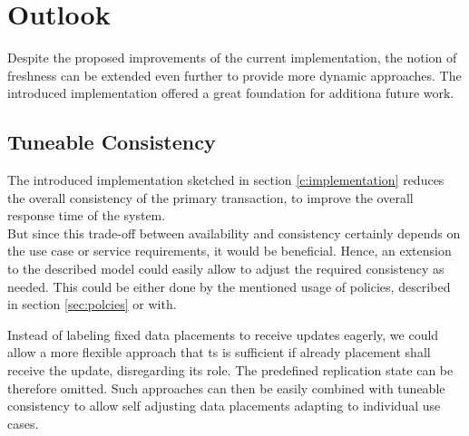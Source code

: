 \chapter{Outlook}
\label{c:outlook}


Despite the proposed improvements of the current implementation, the notion of freshness can be extended even further to provide more dynamic approaches.
The introduced implementation offered a great foundation for additiona future work.



\tocless\section{Tuneable Consistency}
The introduced implementation sketched in section \ref{c:implementation} reduces the overall consistency of the primary transaction,
to improve the overall response time of the system.\\ 
But since this trade-off between availability and consistency certainly depends on the use case or service requirements, it would be beneficial.
Hence, an extension to the described model could easily allow to adjust the required consistency as needed. 
This could be either done by the mentioned usage of policies, described in section \ref{sec:polcies} or with.

Instead of labeling fixed data placements to receive updates eagerly, we could allow a more flexible approach that ts is sufficient if already placement 
shall receive the update, disregarding its role. The predefined replication state can be therefore omitted. 
Such approaches can then be easily combined with tuneable consistency to allow self adjusting data placements  adapting to individual use cases.



